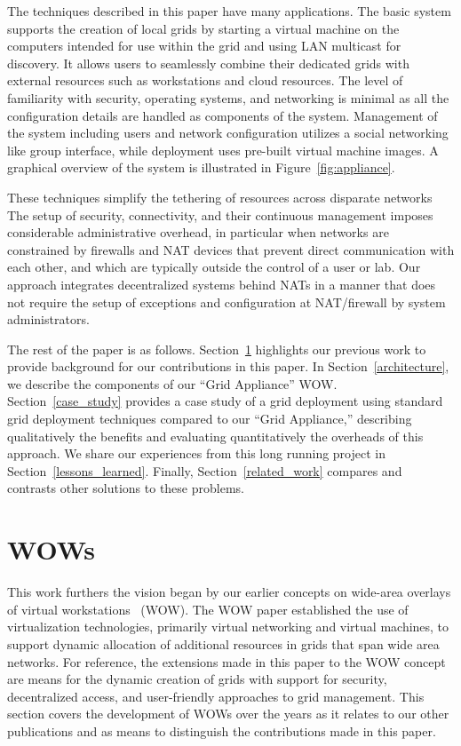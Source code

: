 \documentclass[twocolumn]{svjour3}
\begin{document}
The techniques described in this paper have many applications.  The basic
system supports the creation of local grids by starting a virtual machine on
the computers intended for use within the grid and using LAN multicast for
discovery.  It allows users to seamlessly combine their dedicated grids with
external resources such as workstations and cloud resources.  The level of
familiarity with security, operating systems, and networking is minimal as all
the configuration details are handled as components of the system.  Management
of the system including users and network configuration utilizes a social
networking like group interface, while deployment uses pre-built virtual
machine images.  A graphical overview of the system is illustrated in
Figure~\ref{fig:appliance}.

These techniques simplify the tethering of resources across disparate networks
The setup of security, connectivity, and their continuous management imposes
considerable administrative overhead, in particular when networks are
constrained by firewalls and NAT devices that prevent direct communication with
each other, and which are typically outside the control of a user or lab.  Our
approach integrates decentralized systems behind NATs in a manner that does not
require the setup of exceptions and configuration at NAT/firewall by system
administrators.

The rest of the paper is as follows.  Section~\ref{wow} highlights our previous
work to provide background for our contributions in this paper.  In
Section~\ref{architecture}, we describe the components of our ``Grid
Appliance'' WOW.  Section~\ref{case_study} provides a case study of a grid
deployment using standard grid deployment techniques compared to our ``Grid
Appliance,'' describing qualitatively the benefits and evaluating
quantitatively the overheads of this approach.  We share our experiences from
this long running project in Section~\ref{lessons_learned}.  Finally,
Section~\ref{related_work} compares and contrasts other solutions to these
problems.

\section{WOWs}
\label{wow}

This work furthers the vision began by our earlier concepts on wide-area
overlays of virtual workstations~\cite{wow} (WOW).  The WOW paper established
the use of virtualization technologies, primarily virtual networking and
virtual machines, to support dynamic allocation of additional resources in
grids that span wide area networks.  For reference, the extensions made in this
paper to the WOW concept are means for the dynamic creation of grids with
support for security, decentralized access, and user-friendly approaches to
grid management.  This section covers the development of WOWs over the years as
it relates to our other publications and as means to distinguish the
contributions made in this paper.
\end{document}
